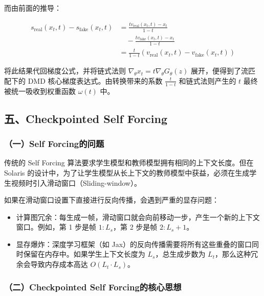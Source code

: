 而由前面的推导：

\[
\begin{aligned}
s_{\mathrm{real}}(x_t,t)-s_{\mathrm{fake}}(x_t,t)
&=
\frac{t v_{\mathrm{real}}(x_t,t)-x_t}{1-t}
\\
&\quad-
\frac{t v_{\mathrm{fake}}(x_t,t)-x_t}{1-t}
\\
&=
\frac{t}{1-t}\left(v_{\mathrm{real}}(x_t,t)-v_{\mathrm{fake}}(x_t,t)\right)
\end{aligned}
\]

将此结果代回梯度公式，并将链式法则 \(\nabla_\theta x_t=t\nabla_\theta G_\theta(z)\) 展开，便得到了流匹配下的 DMD 核心梯度表达式。由转换带来的系数 \(\frac{t}{1-t}\) 和链式法则产生的 \(t\) 最终被统一吸收到权重函数 \(\omega(t)\) 中。

\hypertarget{ux4e94checkpointed-self-forcing}{%
\subsection{五、Checkpointed Self Forcing}\label{ux4e94checkpointed-self-forcing}}

\hypertarget{ux4e00self-forcingux7684ux95eeux9898}{%
\subsubsection{（一）Self Forcing的问题}\label{ux4e00self-forcingux7684ux95eeux9898}}

传统的 Self Forcing 算法要求学生模型和教师模型拥有相同的上下文长度。但在 Solaris 的设计中，为了让学生模型从长上下文的教师模型中获益，必须在生成学生视频时引入滑动窗口（Sliding-window）。

如果在滑动窗口设置下直接进行反向传播，会遇到严重的显存问题：

\begin{itemize}
\tightlist
\item
  计算图冗余：每生成一帧，滑动窗口就会向前移动一步，产生一个新的上下文窗口。例如，第 1 步是帧 \(1:L_s\)，第 2 步是帧 \(2:L_s+1\)。
\item
  显存爆炸：深度学习框架（如 Jax）的反向传播需要将所有这些重叠的窗口同时保留在内存中。如果学生上下文长度为 \(L_s\)，总生成步数为 \(L_t\)，那么这种冗余会导致内存成本高达 \(O(L_t\cdot L_s)\)。
\end{itemize}

\hypertarget{ux4e8ccheckpointed-self-forcingux7684ux6838ux5fc3ux601dux60f3}{%
\subsubsection{（二）Checkpointed Self Forcing的核心思想}\label{ux4e8ccheckpointed-self-forcingux7684ux6838ux5fc3ux601dux60f3}}

